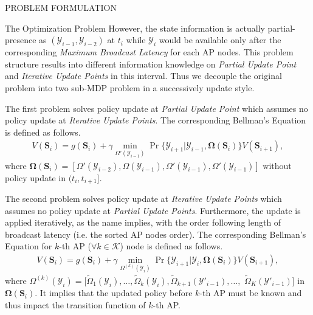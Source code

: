 \documentclass[10pt, conference, letterpaper]{IEEEtran}
\newcommand{\apSet}{\mathcal{K}}
\newcommand{\Stat}{\mathbf{S}}
\newcommand{\Obsv}{\mathcal{Y}}
\newcommand{\Policy}{\boldsymbol{\Omega}}
\begin{document}
\begin{section}{PROBLEM FORMULATION}
\begin{subsection}{The Optimization Problem}
            However, the state information is actually partial-presence as $(\Obsv_{i-1}, \Obsv_{i-2})$ at $t_i$ while $\Obsv_{i}$ would be available only after the corresponding \emph{Maximum Broadcast Latency} for each AP nodes.
            This problem structure results into different information knowledge on \emph{Partial Update Point} and \emph{Iterative Update Points} in this interval.
            Thus we decouple the original problem into two sub-MDP problem in a successively update style.
            
            The first problem solves policy update at \emph{Partial Update Point} which assumes no policy update at \emph{Iterative Update Points}. The corresponding Bellman's Equation is defined as follows.
            \begin{align}
                V(\Stat_i) = g(\Stat_i) + \gamma \min_{\Omega'(\Obsv_{i-1})} \Pr\{ \Obsv_{i+1}|\Obsv_{i-1}, \Policy(\Stat_i) \} V(\Stat_{i+1}),
                \label{sp1}
            \end{align}
            where $\Policy(\Stat_i) = [\Omega'(\Obsv_{i-2}), \Omega(\Obsv_{i-1}), \Omega'(\Obsv_{i-1}), \Omega'(\Obsv_{i-1})]$ without policy update in $(t_i, t_{i+1}]$.
            
            The second problem solves policy update at \emph{Iterative Update Points} which assumes no policy update at \emph{Partial Update Points}.
            Furthermore, the update is applied iteratively, as the name implies, with the order following length of broadcast latency (i.e. the sorted AP nodes order). The corresponding Bellman's Equation for $k$-th AP ($\forall k\in\apSet$) node is defined as follows.
            \begin{align}
                V(\Stat_i) = g(\Stat_i) + \gamma \min_{\Omega^{(k)}(\Obsv_{i})} \Pr\{ \Obsv_{i+1}|\Obsv_{i}, \Policy(\Stat_i) \} V(\Stat_{i+1}),
                \label{sp2}
            \end{align}
            where $\Omega^{(k)}(\Obsv_{i}) = [\tilde{\Omega}_{1}(\Obsv_{i}), \dots, \tilde{\Omega}_{k}(\Obsv_{i}), \tilde{\Omega}_{k+1}(\Obsv'_{i-1}), \dots, $ $\tilde{\Omega}_{K}(\Obsv'_{i-1})]$ in $\Policy(\Stat_i)$.
            It implies that the updated policy before $k$-th AP must be known and thus impact the transition function of $k$-th AP.
            

\end{subsection}
\end{section}
\end{document}
